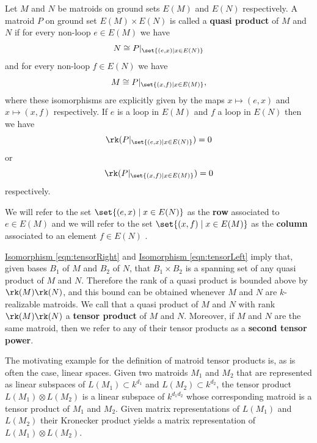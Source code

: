     \begin{definition}\label{def:tensorproduct}
    Let $M$ and $N$ be matroids on ground sets $E(M)$ and $E(N)$ respectively. A matroid $P$ on ground set $E(M)\times E(N)$ is called a \textbf{quasi product} of $M$ and $N$ if for every non-loop $e\in E(M)$ we have
    \begin{equation} \label{eqn:tensorRight}
        N\cong P|_{\set{(e,x)\mid x\in E(N)}}
    \end{equation}
    and for every non-loop $f\in E(N)$ we have
    \begin{equation}\label{eqn:tensorLeft}
        M\cong P|_{\set{(x,f)\mid x\in E(M)}},
    \end{equation}
    where these isomorphisms are explicitly given by the maps $x\mapsto (e,x)$ and $x\mapsto (x,f)$ respectively. If $e$ is a loop in $E(M)$ and $f$ a loop in $E(N)$ then we have
    \begin{equation}\label{eqn:tensorRight0}
        \rk(P|_{\set{(e,x)\mid x\in E(N)}})=0
    \end{equation}
    or
    \begin{equation}\label{eqn:tensorLeft0}
    \rk(P|_{\set{(x,f)\mid x\in E(M)}})=0
    \end{equation}
    respectively.

    We will refer to the set $\set{(e,x)\mid x\in E(N)}$ as the \textbf{row} associated to $e\in E(M)$ and we will refer to the set $\set{(x,f)\mid x\in E(M)}$ as the \textbf{column} associated to an element $f\in E(N)$ .
    \end{definition}
    
    \hyperref[eqn:tensorRight]{Isomorphism \ref*{eqn:tensorRight}} and \hyperref[eqn:tensorLeft]{Isomorphism \ref*{eqn:tensorLeft}} imply that, given bases $B_1$ of $M$ and $B_2$ of $N$, that $B_1\times B_2$ is a spanning set of any quasi product of $M$ and $N$. Therefore the rank of a quasi product is bounded above by $\rk(M)\rk(N)$, and this bound can be obtained whenever $M$ and $N$ are $k$-realizable matroids. We call that a quasi product of $M$ and $N$ with rank $\rk(M)\rk(N)$ a \textbf{tensor product} of $M$ and $N$. Moreover, if $M$ and $N$ are the same matroid, then we refer to any of their tensor products as a \textbf{second tensor power}.

       
    The motivating example for the definition of matroid tensor products is, as is often the case, linear spaces. Given two matroids $M_1$ and $M_2$ that are represented as linear subspaces of $L(M_1)\subset k^{d_1}$ and $L(M_2)\subset k^{d_2}$, the tensor product $L(M_1)\otimes L(M_2)$ is a linear subspace of $k^{d_1d_2}$ whose corresponding matroid is a tensor product of $M_1$ and $M_2$. Given matrix representations of $L(M_1)$ and $L(M_2)$ their Kronecker product yields a matrix representation of $L(M_1)\otimes L(M_2)$.
    
